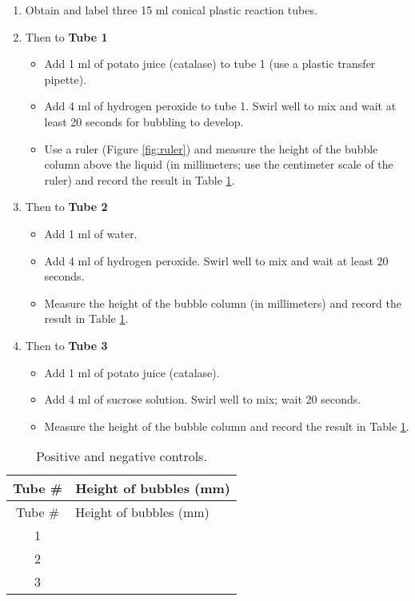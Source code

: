 \begin{enumerate}
\def\labelenumi{\arabic{enumi}.}
\tightlist
\item
  Obtain and label three 15 ml conical plastic reaction tubes.
\item
  Then to \textbf{Tube 1}

  \begin{itemize}
  \tightlist
  \item
    Add 1 ml of potato juice (catalase) to tube 1 (use a plastic
    transfer pipette).
  \item
    Add 4 ml of hydrogen peroxide to tube 1. Swirl well to mix and wait
    at least 20 seconds for bubbling to develop.
  \item
    Use a ruler (Figure \ref{fig:ruler}) and measure the height of the
    bubble column above the liquid (in millimeters; use the centimeter
    scale of the ruler) and record the result in Table
    \ref{tab:control}.
  \end{itemize}
\item
  Then to \textbf{Tube 2}

  \begin{itemize}
  \tightlist
  \item
    Add 1 ml of water.
  \item
    Add 4 ml of hydrogen peroxide. Swirl well to mix and wait at least
    20 seconds.
  \item
    Measure the height of the bubble column (in millimeters) and record
    the result in Table \ref{tab:control}.
  \end{itemize}
\item
  Then to \textbf{Tube 3}

  \begin{itemize}
  \tightlist
  \item
    Add 1 ml of potato juice (catalase).
  \item
    Add 4 ml of sucrose solution. Swirl well to mix; wait 20 seconds.
  \item
    Measure the height of the bubble column and record the result in
    Table \ref{tab:control}.
  \end{itemize}
\end{enumerate}

\begin{longtable}[]{@{}cl@{}}
\caption{\label{tab:control} Positive and negative controls.}\tabularnewline
\toprule
Tube \# & Height of bubbles (mm)\tabularnewline
\midrule
\endfirsthead
\toprule
Tube \# & Height of bubbles (mm)\tabularnewline
\midrule
\endhead
1 &\tabularnewline
2 &\tabularnewline
3 &\tabularnewline
\bottomrule
\end{longtable}

